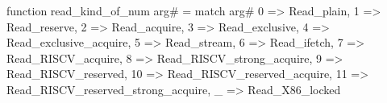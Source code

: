 function read_kind_of_num arg# = match arg# {
  0 => Read_plain,
  1 => Read_reserve,
  2 => Read_acquire,
  3 => Read_exclusive,
  4 => Read_exclusive_acquire,
  5 => Read_stream,
  6 => Read_ifetch,
  7 => Read_RISCV_acquire,
  8 => Read_RISCV_strong_acquire,
  9 => Read_RISCV_reserved,
  10 => Read_RISCV_reserved_acquire,
  11 => Read_RISCV_reserved_strong_acquire,
  _ => Read_X86_locked
}

